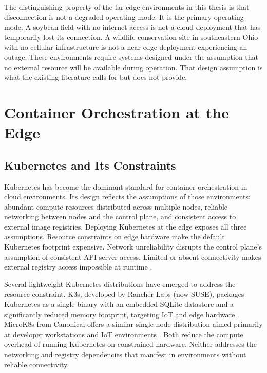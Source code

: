The distinguishing property of the far-edge environments in this thesis is that disconnection is not a degraded operating mode. It is the primary operating mode. A soybean field with no internet access is not a cloud deployment that has temporarily lost its connection. A wildlife conservation site in southeastern Ohio with no cellular infrastructure is not a near-edge deployment experiencing an outage. These environments require systems designed under the assumption that no external resource will be available during operation. That design assumption is what the existing literature calls for but does not provide.
\section{Container Orchestration at the Edge}
\label{sec:container_orches}
\subsection{Kubernetes and Its Constraints}
\label{sec:kube}
Kubernetes has become the dominant standard for container orchestration in cloud environments. Its design reflects the assumptions of those environments: abundant compute resources distributed across multiple nodes, reliable networking between nodes and the control plane, and consistent access to external image registries. Deploying Kubernetes at the edge exposes all three assumptions. Resource constraints on edge hardware make the default Kubernetes footprint expensive. Network unreliability disrupts the control plane's assumption of consistent API server access. Limited or absent connectivity makes external registry access impossible at runtime \cite{cilic2023performance, vano2023cloudnative}.

Several lightweight Kubernetes distributions have emerged to address the resource constraint. K3s, developed by Rancher Labs (now SUSE), packages Kubernetes as a single binary with an embedded SQLite datastore and a significantly reduced memory footprint, targeting IoT and edge hardware \cite{k3sdocs2024}. MicroK8s from Canonical offers a similar single-node distribution aimed primarily at developer workstations and IoT environments \cite{koziolek2023lightweight}. Both reduce the compute overhead of running Kubernetes on constrained hardware. Neither addresses the networking and registry dependencies that manifest in environments without reliable connectivity.
